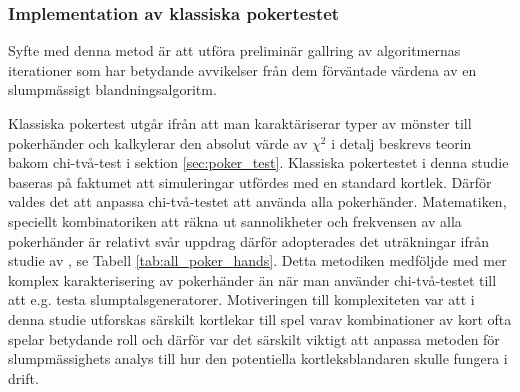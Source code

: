 \documentclass[swedish,a4paper]{article}
\begin{document}






\subsubsection{Implementation av klassiska pokertestet}
\label{sec:poker_test_M}
Syfte med denna metod är att utföra preliminär gallring av algoritmernas
iterationer som har betydande avvikelser från dem förväntade värdena av en slumpmässigt
blandningsalgoritm.  

Klassiska pokertest utgår ifrån att man karaktäriserar typer av mönster
till pokerhänder och kalkylerar  den absolut värde av $\chi^2$ i detalj beskrevs
teorin bakom chi-två-test  i sektion \ref{sec:poker_test}. Klassiska pokertestet 
i denna studie baseras på faktumet att simuleringar utfördes med en
standard kortlek. Därför valdes det att anpassa chi-två-testet att använda alla
pokerhänder. Matematiken, speciellt kombinatoriken att räkna ut sannolikheter
och frekvensen av alla poker\-händer är relativt svår uppdrag därför
adopterades det uträkningar ifrån studie av \textcite{Drew2006}, se Tabell
\ref{tab:all_poker_hands}. Detta metodiken medföljde med mer komplex
karakterisering av poker\-händer än när man använder chi-två-testet till att
e.g. testa slumptalsgeneratorer. Motiveringen till komplexiteten var att i denna
studie utforskas särskilt kortlekar till spel varav kombinationer av kort ofta
spelar betydande roll och därför var det särskilt viktigt att anpassa metoden för slumpmässighets analys till hur den potentiella kortleksblandaren skulle
fungera i drift.
\end{document}
